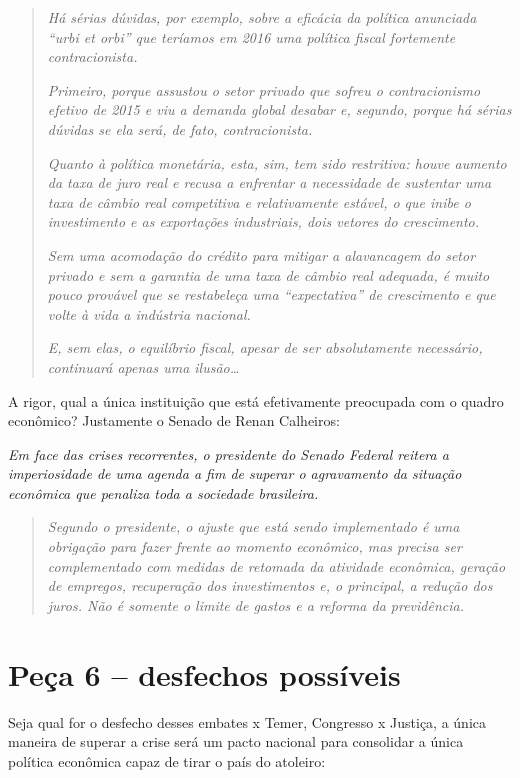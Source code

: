 \begin{quote}
\emph{Há sérias dúvidas, por exemplo, sobre a eficácia da política
anunciada ``urbi et orbi'' que teríamos em 2016 uma política fiscal
fortemente contracionista.}

\emph{Primeiro, porque assustou o setor privado que sofreu o
contracionismo efetivo de 2015 e viu a demanda global desabar e,
segundo, porque há sérias dúvidas se ela será, de fato, contracionista.}

\emph{Quanto à política monetária, esta, sim, tem sido restritiva: houve
aumento da taxa de juro real e recusa a enfrentar a necessidade de
sustentar uma taxa de câmbio real competitiva e relativamente estável, o
que inibe o investimento e as exportações industriais, dois vetores do
crescimento.}

\emph{Sem uma acomodação do crédito para mitigar a alavancagem do setor
privado e sem a garantia de uma taxa de câmbio real adequada, é muito
pouco provável que se restabeleça uma ``expectativa'' de crescimento e
que volte à vida a indústria nacional.}

\emph{E, sem elas, o equilíbrio fiscal, apesar de ser absolutamente
necessário, continuará apenas uma ilusão…}
\end{quote}

A rigor, qual a única instituição que está efetivamente preocupada com o
quadro econômico? Justamente o Senado de Renan Calheiros:

\emph{Em face das crises recorrentes, o presidente do Senado Federal
reitera a imperiosidade de uma agenda a fim de superar o agravamento da
situação econômica que penaliza toda a sociedade brasileira.
\redondo{[…]}}

\begin{quote}
\emph{Segundo o presidente, o ajuste que está sendo implementado é uma
obrigação para fazer frente ao momento econômico, mas precisa ser
complementado com medidas de retomada da atividade econômica, geração de
empregos, recuperação dos investimentos e, o principal, a redução dos
juros. Não é somente o limite de gastos e a reforma da previdência.
\redondo{[…]}}
\end{quote}

\section{Peça 6 -- desfechos possíveis}

Seja qual for o desfecho desses embates  x Temer, Congresso x
Justiça, a única maneira de superar a crise será um pacto nacional para
consolidar a única política econômica capaz de tirar o país do atoleiro:

